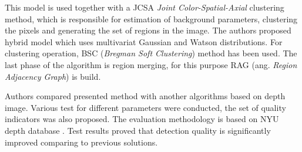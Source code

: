 \documentclass[b5paper,10pt,twoside]{article}
\begin{document}
{This model is used together with a JCSA \textit{Joint Color-Spatial-Axial} clustering method, which is responsible for estimation of background parameters, clustering the pixels and generating the set of regions in the image. The authors proposed hybrid model which uses multivariat Gaussian and Watson distributions. For clustering operation,   
BSC (\textit{Bregman Soft Clustering}) method has been used. The last phase of the algorithm is region merging, for this purpose RAG (ang. \textit{Region Adjacency Graph}) is build. 

Authors compared presented method with another algorithms based on depth image.  Various test for different parameters were conducted, the set of quality indicators was also proposed. The evaluation methodology is based on NYU depth database \cite{}. Test results proved that detection quality is significantly improved comparing to previous solutions.




}
\end{document}
